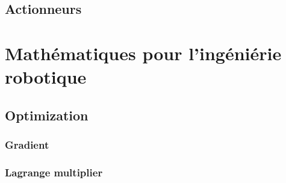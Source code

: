 \documentclass[letterpaper,oneside,french]{book}
\begin{document}
\chapter{Actionneurs}

\part{Mathématiques pour l'ingéniérie robotique}



\chapter{Optimization}
\section{Gradient}
\section{Lagrange multiplier}

\appendix

\end{document}
